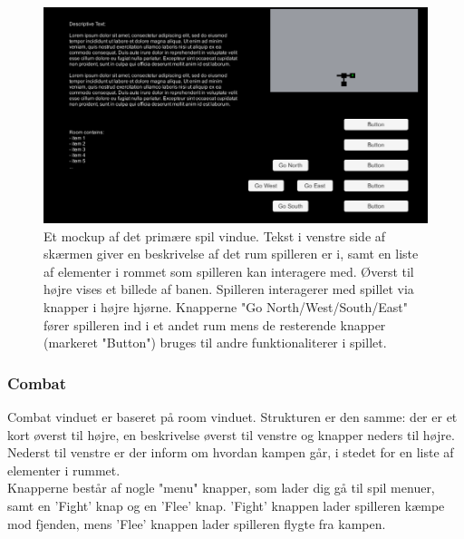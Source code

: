 \begin{figure}[h]
\centering
\includegraphics[width = \textwidth]{02-Body/Images/RoomMockup.PNG}
\caption{Et mockup af det primære spil vindue. Tekst i venstre side af skærmen giver en beskrivelse af det rum spilleren er i, samt en liste af elementer i rommet som spilleren kan interagere med. Øverst til højre vises et billede af banen. Spilleren interagerer med spillet via knapper i højre hjørne. Knapperne "Go {North/West/South/East}" fører spilleren ind i et andet rum mens de resterende knapper (markeret "Button") bruges til andre funktionaliterer i spillet.}
\label{fig:Design-FE-mockup-room}
\end{figure}

\subsubsection{Combat}

Combat vinduet er baseret på room vinduet. Strukturen er den samme: der er et kort øverst til højre, en beskrivelse øverst til venstre og knapper neders til højre. Nederst til venstre er der inform om hvordan kampen går,  i stedet for en liste af elementer i rummet.\\
Knapperne består af nogle "menu" knapper, som lader dig gå til spil menuer, samt en 'Fight' knap og en 'Flee' knap. 'Fight' knappen lader spilleren kæmpe mod fjenden, mens 'Flee' knappen lader spilleren flygte fra kampen.


